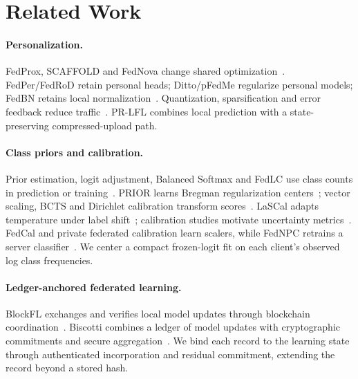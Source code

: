\section{Related Work}
\paragraph{Personalization.}
FedProx, SCAFFOLD and FedNova change shared optimization~\cite{li2020fedprox,karimireddy2020scaffold,wang2020fednova}. FedPer/FedRoD retain personal heads; Ditto/pFedMe regularize personal models; FedBN retains local normalization~\cite{li2021ditto,dinh2020pfedme,li2021fedbn}. Quantization, sparsification and error feedback reduce traffic~\cite{alistarh2017qsgd,stich2018sparsified,karimireddy2019errorfeedback}. PR-LFL combines local prediction with a state-preserving compressed-upload path.

\paragraph{Class priors and calibration.}
Prior estimation, logit adjustment, Balanced Softmax and FedLC use class counts in prediction or training~\cite{saerens2002prior,lipton2018bbse,menon2021logitadjust,ren2020balanced,zhang2022fedlc}. PRIOR learns Bregman regularization centers~\cite{shi2023prior}; vector scaling, BCTS and Dirichlet calibration transform scores~\cite{guo2017calibration,alexandari2020labelshift,kull2019dirichlet}. LaSCal adapts temperature under label shift~\cite{popordanoska2024lascal}; calibration studies motivate uncertainty metrics~\cite{vaicenavicius2019calibration,kumar2019verified,ovadia2019shift}. FedCal and private federated calibration learn scalers, while FedNPC retrains a server classifier~\cite{peng2024fedcal,maddock2025privatecal,gao2026fednpc}. We center a compact frozen-logit fit on each client's observed log class frequencies.

\paragraph{Ledger-anchored federated learning.}
BlockFL exchanges and verifies local model updates through blockchain coordination~\cite{kim2020blockfl}. Biscotti combines a ledger of model updates with cryptographic commitments and secure aggregation~\cite{shayan2021biscotti}. We bind each record to the learning state through authenticated incorporation and residual commitment, extending the record beyond a stored hash.
